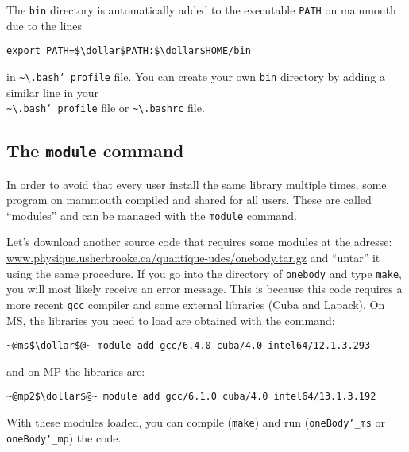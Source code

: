 \documentclass[10pt,letter]{article}
\newcommand{\dollar}{\mbox{\textdollar}}
\begin{document}
The \texttt{bin}  directory is automatically added to the executable \texttt{PATH}  on mammouth due to the lines

\begin{bashInput}[backgroundcolor=myblue]
\begin{lstlisting}[style=FileInputStyle]
export PATH=$\dollar$PATH:$\dollar$HOME/bin
\end{lstlisting}
\end{bashInput}
in \texttt{\textasciitilde\textbackslash.bash\char`_profile}  file.
You can create your own \texttt{bin}  directory by adding a similar line in your \\ \texttt{\textasciitilde\textbackslash.bash\char`_profile} file 
or \texttt{\textasciitilde\textbackslash.bashrc}  file.

\subsection{The \texttt{module}  command}

In order to avoid that every user install the same library multiple times, 
some program on mammouth compiled and shared for all users.
These are called ``modules'' and can be managed with the \texttt{module} command.

Let's download another source code that requires some modules at the adresse:
\url{www.physique.usherbrooke.ca/quantique-udes/onebody.tar.gz} and ``untar'' it using the same procedure.
If you go into the directory of \texttt{onebody} and type \texttt{make}, you will most likely receive an error message.
This is because this code requires a more recent \texttt{gcc} compiler and some external libraries 
(Cuba and Lapack).
On MS, the libraries you need to load are obtained with the command:
\begin{bashInput}
\begin{lstlisting}[style=BashInputStyle]
~@ms$\dollar$@~ module add gcc/6.4.0 cuba/4.0 intel64/12.1.3.293
\end{lstlisting}
\end{bashInput}
and on MP the libraries are:
\begin{bashInput}
\begin{lstlisting}[style=BashInputStyle]
~@mp2$\dollar$@~ module add gcc/6.1.0 cuba/4.0 intel64/13.1.3.192
\end{lstlisting}
\end{bashInput}
With these modules loaded, you can compile (\texttt{make}) and run (\texttt{oneBody\char`_ms} or \texttt{oneBody\char`_mp}) 
the code.
\end{document}
